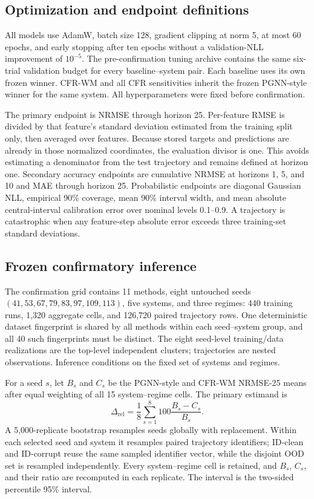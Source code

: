 \subsection{Optimization and endpoint definitions}

All models use AdamW, batch size 128, gradient clipping at norm 5, at most 60
epochs, and early stopping after ten epochs without a validation-NLL
improvement of $10^{-5}$. The pre-confirmation tuning archive contains the same
six-trial validation budget for every baseline--system pair. Each baseline uses
its own frozen winner. CFR-WM and all CFR sensitivities inherit the frozen PGNN-style
winner for the same system. All hyperparameters were fixed before confirmation.

The primary endpoint is NRMSE through horizon 25. Per-feature RMSE is divided
by that feature's standard deviation estimated from the training split only,
then averaged over features. Because stored targets and predictions are already
in those normalized coordinates, the evaluation divisor is one. This avoids
estimating a denominator from the test trajectory and remains defined at
horizon one. Secondary accuracy endpoints are cumulative NRMSE at horizons 1,
5, and 10 and MAE through horizon 25. Probabilistic endpoints are diagonal
Gaussian NLL, empirical 90\% coverage, mean 90\% interval width, and mean
absolute central-interval calibration error over nominal levels 0.1--0.9. A
trajectory is catastrophic when any feature-step absolute error exceeds three
training-set standard deviations.

\subsection{Frozen confirmatory inference}

The confirmation grid contains 11 methods, eight untouched seeds
$(41,53,67,79,83,97,109,113)$, five systems, and three regimes: 440 training
runs, 1,320 aggregate cells, and 126,720 paired trajectory rows. One
deterministic dataset fingerprint is shared by all methods within each
seed--system group, and all 40 such fingerprints must be distinct. The eight
seed-level training/data realizations are the top-level independent clusters;
trajectories are nested observations. Inference conditions on the fixed set of
systems and regimes.

For a seed $s$, let $B_s$ and $C_s$ be the PGNN-style and CFR-WM NRMSE-25 means after
equal weighting of all 15 system--regime cells. The primary estimand is
\begin{equation}
 \Delta_{\mathrm{rel}}=\frac{1}{8}\sum_{s=1}^{8}
 100\frac{B_s-C_s}{B_s}.
 \label{eq:primary-estimand}
\end{equation}
A 5,000-replicate bootstrap resamples seeds globally with replacement. Within
each selected seed and system it resamples paired trajectory identifiers;
ID-clean and ID-corrupt reuse the same sampled identifier vector, while the
disjoint OOD set is resampled independently. Every system--regime cell is
retained, and $B_s$, $C_s$, and their ratio are recomputed in each replicate.
The interval is the two-sided percentile 95\% interval.

